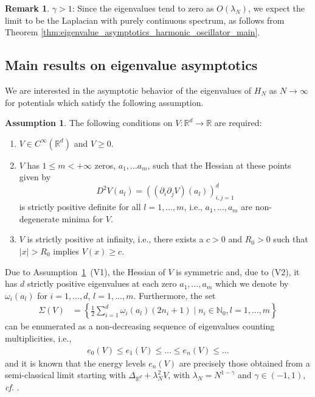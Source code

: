 \documentclass[12pt, reqno]{amsart}
\theoremstyle{definition}
\newtheorem{assumption}[theorem]{Assumption}
\newtheorem*{remark}{Remark}
\numberwithin{equation}{section}
\newcommand{\R}{{\mathbb R}}
\newcommand{\N}{{\mathbb N}}
\begin{document}
\begin{remark}
$ \gamma>1$: Since the eigenvalues tend to zero as $O(\lambda_N)$, we expect the limit to be the Laplacian with purely continuous spectrum, as follows from Theorem \ref{thm:eigenvalue_asymptotics_harmonic_oscillator_main}. 

\end{remark}



\subsection{Main results on eigenvalue asymptotics}\label{subsec:main}

We are interested in the asymptotic behavior of the eigenvalues of $H_N$ as $N\to\infty$ for potentials which satisfy the following assumption.

\begin{assumption}\label{assumption}
The following conditions on $V:\R^d\to \R$ are required:
    \begin{enumerate}
	\item[(V1)] $V\in C^{\infty}(\mathbb{R}^d)$ and $V\geq 0$.
	\item[(V2)] $V$ has $1\leq m <+\infty$ zeros, $a_1,\dots a_m$, such that the Hessian at these points  given by    
    \begin{equation*}%
	   D^2V(a_l) = ((\partial_{i}\partial_{j}V)(a_l))_{i,j=1}^d
	\end{equation*}
    is strictly positive definite for all $l=1,\ldots,m$, i.e., $a_1,\ldots, a_m$ are non-degenerate minima for $V$.
	\item[(V3)] $V$ is strictly positive at infinity, i.e., there exists a $c >0 $ and $R_{0}>0$ such that $|x|> R_{0}$ implies $V(x)\geq c$.
    \end{enumerate}
\end{assumption}
Due to Assumption~\ref{assumption}~(V1), the Hessian of $V$ is symmetric and, due to (V2), it has $d$ strictly positive eigenvalues at each zero $a_1,\ldots,a_m$ which we denote by $\omega_i(a_l)$ for $i=1,\ldots,d$, $l=1,\ldots,m$.     Furthermore, the set
\begin{align*}
    \Sigma(V)&=\left\{\frac12\sum_{i=1}^d \omega_i(a_l)(2n_i+1) \mid n_i\in \N_0, l=1,\ldots,m\right\}
   \end{align*}
   can be enumerated as a non-decreasing sequence of eigenvalues counting multiplicities, i.e., 
\begin{align*}
    e_0(V)\leq e_1(V)\leq\ldots \leq e_n(V)\leq\ldots
\end{align*}
and it is known that  the energy levels $e_n(V)$ are precisely those obtained from a semi-classical limit starting with $\Delta_{\R^d}+\lambda_N^2 V$, with $\lambda_N=N^{1-\gamma}$ and $\gamma\in (-1,1)$, \textit{cf.} \cite[Theorem~1.1]{Simon_1983}. 
\end{document}
